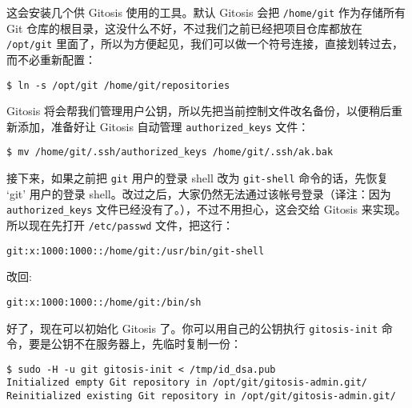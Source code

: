 \documentclass[a4paper]{book}
\begin{document}
这会安装几个供 Gitosis 使用的工具。默认 Gitosis 会把 \texttt{/home/git} 作为存储所有 Git 仓库的根目录，这没什么不好，不过我们之前已经把项目仓库都放在 \texttt{/opt/git} 里面了，所以为方便起见，我们可以做一个符号连接，直接划转过去，而不必重新配置：

\begin{shaded}\begin{verbatim}
$ ln -s /opt/git /home/git/repositories
\end{verbatim}\end{shaded}

Gitosis 将会帮我们管理用户公钥，所以先把当前控制文件改名备份，以便稍后重新添加，准备好让 Gitosis 自动管理 \texttt{authorized\_keys} 文件：

\begin{shaded}\begin{verbatim}
$ mv /home/git/.ssh/authorized_keys /home/git/.ssh/ak.bak
\end{verbatim}\end{shaded}

接下来，如果之前把 \texttt{git} 用户的登录 shell 改为 \texttt{git-shell} 命令的话，先恢复 `git' 用户的登录 shell。改过之后，大家仍然无法通过该帐号登录（译注：因为 \texttt{authorized\_keys} 文件已经没有了。），不过不用担心，这会交给 Gitosis 来实现。所以现在先打开 \texttt{/etc/passwd} 文件，把这行：

\begin{shaded}\begin{verbatim}
git:x:1000:1000::/home/git:/usr/bin/git-shell
\end{verbatim}\end{shaded}

改回:

\begin{shaded}\begin{verbatim}
git:x:1000:1000::/home/git:/bin/sh
\end{verbatim}\end{shaded}

好了，现在可以初始化 Gitosis 了。你可以用自己的公钥执行 \texttt{gitosis-init} 命令，要是公钥不在服务器上，先临时复制一份：

\begin{shaded}\begin{verbatim}
$ sudo -H -u git gitosis-init < /tmp/id_dsa.pub
Initialized empty Git repository in /opt/git/gitosis-admin.git/
Reinitialized existing Git repository in /opt/git/gitosis-admin.git/
\end{verbatim}\end{shaded}
\end{document}
